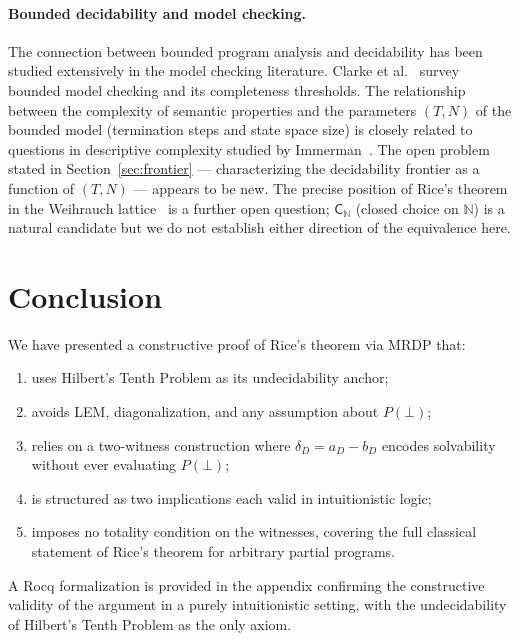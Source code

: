 \documentclass{lmcs}
\begin{document}
\paragraph{Bounded decidability and model checking.}
The connection between bounded program analysis and decidability has been
studied extensively in the model checking literature. Clarke et
al.~\cite{clarke2018} survey bounded model checking and its completeness
thresholds. The relationship between the complexity of semantic properties
and the parameters $(T, N)$ of the bounded model (termination steps and
state space size) is closely related to questions in descriptive complexity
studied by Immerman~\cite{immerman1999}. The open problem stated in
Section~\ref{sec:frontier} --- characterizing the decidability frontier as a
function of $(T, N)$ --- appears to be new.
The precise position of Rice's theorem in the Weihrauch
lattice~\cite{brattka2021} is a further open question; $\mathsf{C}_\mathbb{N}$
(closed choice on $\mathbb{N}$) is a natural candidate but we do not
establish either direction of the equivalence here.

\section{Conclusion}\label{sec:conclusion}

We have presented a constructive proof of Rice's theorem via MRDP that:
\begin{enumerate}
  \item uses Hilbert's Tenth Problem as its undecidability anchor;
  \item avoids LEM, diagonalization, and any assumption about $P(\bot)$;
  \item relies on a two-witness construction where $\delta_D = a_D - b_D$
        encodes solvability without ever evaluating $P(\bot)$;
  \item is structured as two implications each valid in intuitionistic logic;
  \item imposes no totality condition on the witnesses, covering the full
        classical statement of Rice's theorem for arbitrary partial programs.
\end{enumerate}

A Rocq formalization is provided in the appendix confirming the constructive
validity of the argument in a purely intuitionistic setting, with the
undecidability of Hilbert's Tenth Problem as the only axiom.
\end{document}

